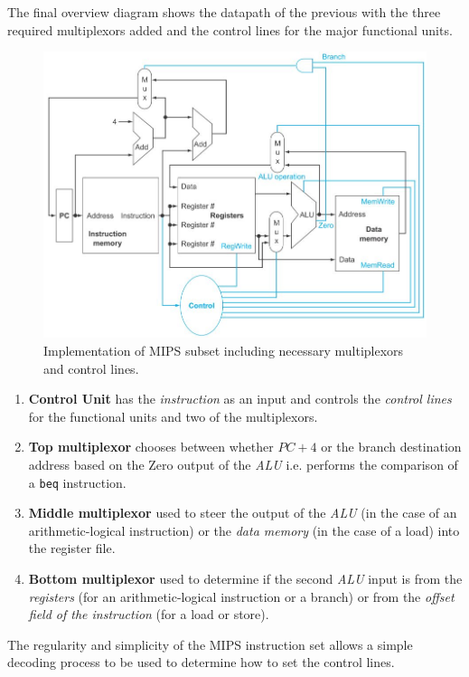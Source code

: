\documentclass[10pt,a4paper]{article}
\begin{document}
The final overview diagram shows the datapath of the previous with the three required multiplexors added
and the control lines for the major functional units.
\begin{figure} [h!]
    \centering
    \includegraphics[scale=0.65]{Data path}
    \caption{Implementation of MIPS subset including necessary multiplexors and control lines. }
\end{figure} 
\begin{enumerate}
    \item \textbf{Control Unit} has the \textit{instruction} as an input and controls the \textit{control lines} for the functional units and two of the multiplexors. 
    \item \textbf{Top multiplexor} chooses between whether $PC + 4$ or the branch destination
    address based on the Zero output of the \textit{ALU} i.e. performs the comparison of a \texttt{beq}
    instruction.
    \item  \textbf{Middle multiplexor} used to steer the output of the \textit{ALU} (in the case of
    an arithmetic-logical instruction) or the \textit{data memory} (in the case of a load) into the
    register file.
    \item  \textbf{Bottom multiplexor} used to determine if the second \textit{ALU} input is from
    the \textit{registers} (for an arithmetic-logical instruction or a branch) or from the
    \textit{offset field of the instruction} (for a load or store). 
\end{enumerate}

The regularity and simplicity of the MIPS instruction set allows a simple decoding process to be
used to determine how to set the control lines.
\end{document}
